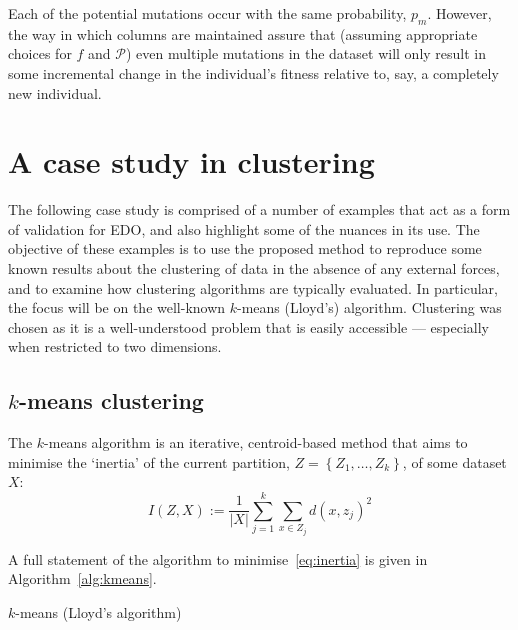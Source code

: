 
Each of the potential mutations occur with the same probability, \(p_m\).
However, the way in which columns are maintained assure that (assuming
appropriate choices for \(f\) and \(\mathcal{P}\)) even multiple mutations in
the dataset will only result in some incremental change in the individual's
fitness relative to, say, a completely new individual.



\section{A case study in clustering}\label{section:examples}

The following case study is comprised of a number of examples that act as a form
of validation for EDO, and also highlight some of the nuances in its use. The
objective of these examples is to use the proposed method to reproduce some
known results about the clustering of data in the absence of any external
forces, and to examine how clustering algorithms are typically evaluated. In
particular, the focus will be on the well-known \(k\)-means (Lloyd's) algorithm.
Clustering was chosen as it is a well-understood problem that is easily
accessible --- especially when restricted to two dimensions.

\subsection{\(k\)-means clustering}

The \(k\)-means algorithm is an iterative, centroid-based method that aims to
minimise the `inertia' of the current partition, \(Z = \left\{Z_1, \ldots,
Z_k\right\}\), of some dataset \(X\):
\begin{equation}
    I(Z, X) := \frac{1}{|X|} \sum_{j=1}^{k} \sum_{x \in Z_j} {d(x, z_j)}^2
    \label{eq:inertia}
\end{equation}

A full statement of the algorithm to minimise~\eqref{eq:inertia} is given in
Algorithm~\ref{alg:kmeans}.

\balg%

\caption{\(k\)-means (Lloyd's algorithm)}\label{alg:kmeans}
\ealg%


